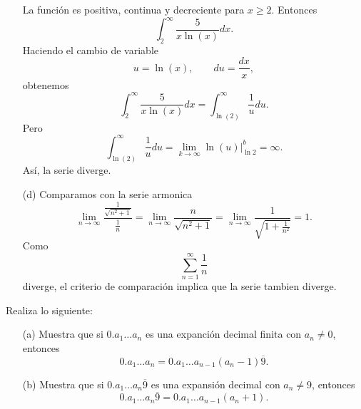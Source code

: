 \documentclass[12pt,a4paper]{article}
\begin{document}
\begin{solucion}
\begin{enumerate}
            La función es positiva, continua y decreciente para $x\geq2$. Entonces
            \begin{equation*}
                \int_{2}^{\infty}\frac{5}{x\ln(x)}dx.
            \end{equation*}
            Haciendo el cambio de variable
            \begin{equation*}
                u=\ln(x),\qquad du=\frac{dx}{x},
            \end{equation*}
            obtenemos
            \begin{equation*}
                \int_{2}^{\infty}\frac{5}{x\ln(x)}dx=\int_{\ln(2)}^{\infty}\frac{1}{u}du.
            \end{equation*}
            Pero
            \begin{equation*}
                \int_{\ln(2)}^{\infty}\frac{1}{u}du=\lim_{k\to\infty}\ln(u)\Big|_{\ln 2}^{b}=\infty.
            \end{equation*}
            Así, la serie diverge.
            \item[(d)] Comparamos con la serie armonica
            \begin{equation*}
                \lim_{n\to\infty}\frac{\frac{1}{\sqrt{n^{2}+1}}}{\frac{1}{n}}=\lim_{n\to\infty}\frac{n}{\sqrt{n^{2}+1}}=\lim_{n\to\infty}\frac{1}{\sqrt{1+\frac{1}{n^{2}}}}=1.
            \end{equation*}
            Como
            \begin{equation*}
                \sum_{n=1}^{\infty}\frac{1}{n}
            \end{equation*}
            diverge, el criterio de comparación implica que la serie tambien diverge.
        \end{enumerate}
    \end{solucion}

    \begin{mdframed}[style=mdpinkbox,frametitle={Ejercicio 5}]
        Realiza lo siguiente:
        \begin{enumerate}
            \item[(a)] Muestra que si $0.a_{1}\dots a_{n}$ es una expanción decimal finita con $a_{n}\neq0$,
            entonces
            \begin{equation*}
                0.a_{1}\dots a_{n}=0.a_{1}\dots a_{n-1}(a_{n}-1)\overline{9}.
            \end{equation*}
            \item[(b)] Muestra que si $0.a_{1}\dots a_{n}\overline{9}$ es una expansión decimal con
            $a_{n}\neq9$, entonces
            \begin{equation*}
                0.a_{1}\dots a_{n}\overline{9}=0.a_{1}\dots a_{n-1}(a_{n}+1).
            \end{equation*}
        \end{enumerate}
    \end{mdframed}
\end{document}
